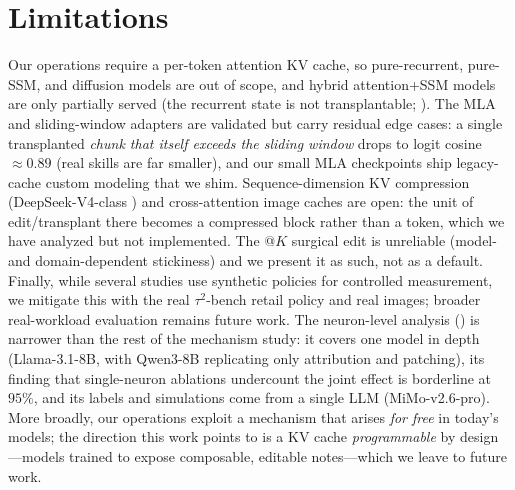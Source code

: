 \section{Limitations}
\label{sec:limitations}

Our operations require a per-token attention KV cache, so pure-recurrent, pure-SSM, and diffusion models
are out of scope, and hybrid attention+SSM models are only partially served (the recurrent state is not
transplantable; ). The MLA and sliding-window adapters are validated but carry residual
edge cases: a single transplanted \emph{chunk that itself exceeds the sliding window} drops to logit cosine
$\approx 0.89$ (real skills are far smaller), and our small MLA checkpoints ship legacy-cache custom
modeling that we shim. Sequence-dimension KV compression (DeepSeek-V4-class \citep{deepseekv4}) and cross-attention image
caches are open: the unit of edit/transplant there becomes a compressed block rather than a token, which we
have analyzed but not implemented. The \fieldsel{}@$K$ surgical edit is unreliable (model- and
domain-dependent stickiness) and we present it as such, not as a default. Finally, while several studies use
synthetic policies for controlled measurement, we mitigate this with the real \(\tau^2\)-bench retail policy
and real images; broader real-workload evaluation remains future work. The neuron-level analysis
() is narrower than the rest of the mechanism study: it covers one model in depth
(Llama-3.1-8B, with Qwen3-8B replicating only attribution and patching), its finding that single-neuron
ablations undercount the joint effect is borderline at $95\%$, and its labels and simulations come from a
single LLM (MiMo-v2.6-pro). More broadly, our operations exploit
a mechanism that arises \emph{for free} in today's models; the direction this work points to is a KV cache
\emph{programmable} by design---models trained to expose composable, editable notes---which we leave to
future work.
